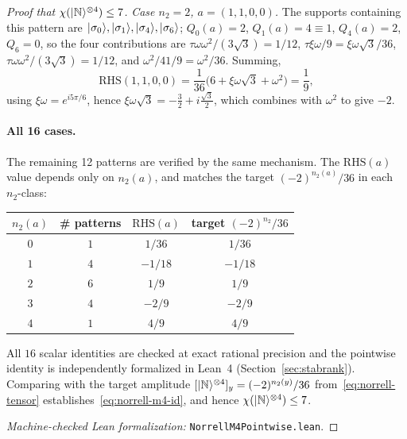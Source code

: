 \documentclass[11pt]{article}
\theoremstyle{definition}
\newcommand{\microspace}{\mspace{0.5mu}}
\newcommand{\ket}[1]{\lvert\microspace #1 \microspace \rangle}
\newcommand{\chiR}{\chi}
\newcommand{\Norrell}{\ket{\mathbb{N}}}
\begin{document}
\begin{proof}[Proof that $\chiR(\Norrell^{\otimes 4}) \le 7$]
		\emph{Case $n_2 = 2$, $a = (1, 1, 0, 0)$.} The supports containing
		this pattern are $\ket{\sigma_0}, \ket{\sigma_1}, \ket{\sigma_4}, \ket{\sigma_6}$;
		$Q_0(a) = 2$, $Q_1(a) = 4 \equiv 1$, $Q_4(a) = 2$, $Q_6 = 0$, so the
		four contributions are
		$\tau\omega \omega^2 / (3\sqrt 3) = 1/12$,
		$\tau\xi \omega/9 = \xi\omega \sqrt 3 / 36$,
		$\tau\omega \omega^2 / (3\sqrt 3) = 1/12$, and
		$\omega^2 / 4 1/9 = \omega^2 / 36$. Summing,
		\begin{equation}\label{eq:norrell-m4-rhs-n22}
			\mathrm{RHS}(1,1,0,0)
			= \frac{1}{36} \big(6 + \xi \omega \sqrt 3 + \omega^2\big)
			= \frac{1}{9},
		\end{equation}
		using $\xi \omega = e^{i 5\pi/6}$, hence $\xi \omega \sqrt 3 =
		-\frac{3}{2} + i \frac{\sqrt 3}{2}$, which combines with $\omega^2$
		to give $-2$.
		
		\paragraph{All 16 cases.}
		The remaining 12 patterns are verified by the same mechanism. The
		$\mathrm{RHS}(a)$ value depends only on $n_2(a)$, and matches the
		target $(-2)^{n_2(a)}/36$ in each $n_2$-class:
		\begin{center}
			\renewcommand{\arraystretch}{1.2}
			\begin{tabular}{c|c|c|c}
				\toprule
				$n_2(a)$ & \# patterns & $\mathrm{RHS}(a)$ & target $(-2)^{n_2}/36$ \\
				\midrule
				$0$ & $1$ & $1/36$    & $1/36$ \\
				$1$ & $4$ & $-1/18$   & $-1/18$ \\
				$2$ & $6$ & $1/9$     & $1/9$ \\
				$3$ & $4$ & $-2/9$    & $-2/9$ \\
				$4$ & $1$ & $4/9$     & $4/9$ \\
				\bottomrule
			\end{tabular}
		\end{center}
		All $16$ scalar identities are checked at exact rational precision
		and the pointwise identity is independently formalized in Lean~4
		(Section~\ref{sec:stabrank}). Comparing with the target amplitude
		$[\Norrell^{\otimes 4}]_y = (-2)^{n_2(y)}/36$
		from~\eqref{eq:norrell-tensor}
		establishes~\eqref{eq:norrell-m4-id}, and hence
		$\chiR(\Norrell^{\otimes 4}) \le 7$.

		\textit{Machine-checked Lean formalization:}
		\texttt{NorrellM4Pointwise.lean}.
	\end{proof}
	
\end{document}

